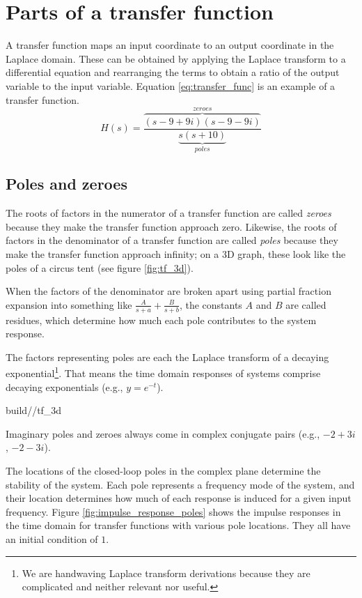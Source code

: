 \section{Parts of a transfer function}

A transfer function maps an input coordinate to an output coordinate in the
Laplace domain. These can be obtained by applying the Laplace transform to a
differential equation and rearranging the terms to obtain a ratio of the output
variable to the input variable. Equation \eqref{eq:transfer_func} is an example
of a transfer function.
\begin{equation} \label{eq:transfer_func}
  H(s) = \frac{\overbrace{(s-9+9i)(s-9-9i)}^{zeroes}}
    {\underbrace{s(s+10)}_{poles}}
\end{equation}

\subsection{Poles and zeroes}

The roots of factors in the numerator of a transfer function are called
\textit{zeroes} because they make the transfer function approach zero. Likewise,
the roots of factors in the denominator of a transfer function are called
\textit{poles} because they make the transfer function approach infinity; on a
3D graph, these look like the poles of a circus tent (see figure
\ref{fig:tf_3d}).

When the factors of the denominator are broken apart using partial fraction
expansion into something like $\frac{A}{s + a} + \frac{B}{s + b}$, the constants
$A$ and $B$ are called residues, which determine how much each pole contributes
to the \gls{system response}.

The factors representing poles are each the Laplace transform of a decaying
exponential\footnote{We are handwaving Laplace transform derivations because
they are complicated and neither relevant nor useful.}. That means the time
domain responses of \glspl{system} comprise decaying exponentials (e.g.,
$y = e^{-t}$).
\begin{svg}{build/\chapterpath/tf_3d}
  \caption{Equation \eqref{eq:transfer_func} plotted in 3D}
  \label{fig:tf_3d}
\end{svg}
\begin{remark}
  Imaginary poles and zeroes always come in complex conjugate pairs (e.g.,
  $-2 + 3i$, $-2 - 3i$).
\end{remark}

The locations of the closed-loop poles in the complex plane determine the
stability of the \gls{system}. Each pole represents a frequency mode of the
\gls{system}, and their location determines how much of each response is induced
for a given input frequency. Figure \ref{fig:impulse_response_poles} shows the
\glspl{impulse response} in the time domain for transfer functions with various
pole locations. They all have an initial condition of $1$.
\begin{bookfigure}
  
  \caption{Impulse response vs pole location}
  \label{fig:impulse_response_poles}
\end{bookfigure}

